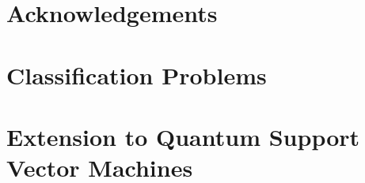 \documentclass[
    paper=a4, 
    lang=en, 
    font=kpfonts,
    ptsize=12pt,
    titles=bf,
    hanging-titles=true,
    cleanlook, printdayoff, %
    final %
]
{skrapport}
\begin{document}
    \section*{Acknowledgements}
        \label{sec:ack}
        

    \printbibliography

    \pagebreak
    \appendix

    \section{Classification Problems}
    \label{app:classification}
    

    \section{Extension to Quantum Support Vector Machines}
    \label{app:qsvm}
    
\end{document}

